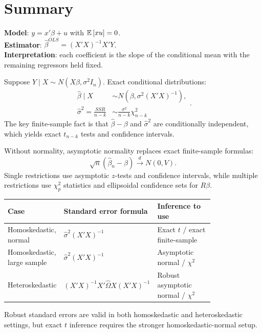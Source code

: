 \section{Summary}

\begin{remark}
	\leavevmode\hfill\break
	\textbf{Model}: $y = x'\beta + u$ with $\mathbb{E}\left[xu\right] = 0$. \\
	\textbf{Estimator}: $\hat{\beta}^{OLS} = (X'X)^{-1}X'Y$. \\
	\textbf{Interpretation}: each coefficient is the slope of the conditional mean with the remaining regressors held fixed.
\end{remark}

\begin{remark}
	Suppose $Y \mid X \sim N(X\beta,\sigma^2 I_n)$. Exact conditional distributions:
	\[
		\begin{aligned}
			\hat{\beta} \mid X &\sim N\left(\beta,\sigma^2 (X'X)^{-1}\right), \\
			\hat{\sigma}^2 = \frac{SSR}{n-k} &\sim \frac{\sigma^2}{n-k}\chi^2_{n-k}
		\end{aligned}
	.\]
	The key finite-sample fact is that $\hat{\beta}-\beta$ and $\hat{\sigma}^2$ are conditionally independent, which yields exact $t_{n-k}$ tests and confidence intervals.
\end{remark}

\begin{remark}
	Without normality, asymptotic normality replaces exact finite-sample formulas:
	\[
		\sqrt{n}(\hat{\beta}_n-\beta) \xrightarrow{d} N(0,V)
	.\]
	Single restrictions use asymptotic $z$-tests and confidence intervals, while multiple restrictions use $\chi^2_p$ statistics and ellipsoidal confidence sets for $R\beta$.
\end{remark}

\begin{remark}
		\begin{center}
		\small
		\renewcommand{\arraystretch}{1.1}
		\begin{tabular}{p{0.20\linewidth}p{0.27\linewidth}p{0.33\linewidth}}
			\toprule
			Case & Standard error formula & Inference to use \\
			\midrule
			Homoskedastic, normal & $\hat{\sigma}^2(X'X)^{-1}$ & Exact $t$ / exact finite-sample \\
			Homoskedastic, large sample & $\hat{\sigma}^2(X'X)^{-1}$ & Asymptotic normal / $\chi^2$ \\
			Heteroskedastic & $(X'X)^{-1}X'\hat{\Omega}X(X'X)^{-1}$ & Robust asymptotic normal / $\chi^2$ \\
			\bottomrule
		\end{tabular}
		\end{center}
		Robust standard errors are valid in both homoskedastic and heteroskedastic settings, but exact $t$ inference requires the stronger homoskedastic-normal setup.
\end{remark}

